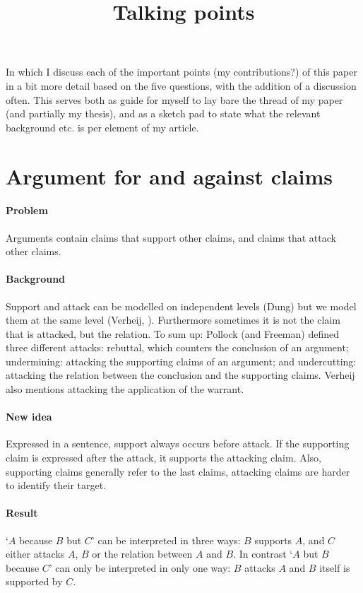 \documentclass{article}
\let\stdsection\section
\renewcommand\section{\newpage\stdsection}
\begin{document}
\title{Talking points}
\maketitle{}
In which I discuss each of the important points (my contributions?) of this paper in a bit more detail based on the five questions, with the addition of a discussion often. This serves both as guide for myself to lay bare the thread of my paper (and partially my thesis), and as a sketch pad to state what the relevant background etc. is per element of my article.

\section{Argument for and against claims}

\paragraph{Problem} Arguments contain claims that support other claims, and claims that attack other claims.
\paragraph{Background} Support and attack can be modelled on independent levels (Dung) but we model them at the same level (Verheij, \cite{peldszus2013argument}). Furthermore sometimes it is not the claim that is attacked, but the relation. To sum up: Pollock (and Freeman) defined three different attacks: rebuttal, which counters the conclusion of an argument; undermining: attacking the supporting claims of an argument; and undercutting: attacking the relation between the conclusion and the supporting claims. Verheij\cite{verheij2005a} also mentions attacking the application of the warrant.
\paragraph{New idea} Expressed in a sentence, support always occurs before attack. If the supporting claim is expressed after the attack, it supports the attacking claim. Also, supporting claims generally refer to the last claims, attacking claims are harder to identify their target.
\paragraph{Result} `$A$ because $B$ but $C$' can be interpreted in three ways: $B$ supports $A$, and $C$ either attacks $A$, $B$ or the relation between $A$ and $B$. In contrast `$A$ but $B$ because $C$' can only be interpreted in only one way: $B$ attacks $A$ and $B$ itself is supported by $C$.
\end{document}
